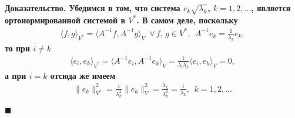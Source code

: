 \documentclass{report}
\newenvironment{Proof}{\par\noindent\bf Доказательство.\rm}{ $\blacksquare$\par}
\begin{document}
\begin{Proof}
Убедимся в том, что система $e_k\sqrt{\lambda_k}$, $k=1,2,\dots$, является ортонормированной системой в $V^*$. В самом деле, поскольку
\begin{gather*}
\langle f,g\rangle_{V^*}=\langle A^{-1}f,A^{-1}g\rangle_V\,\,\,\forall\,f,\,g\in V^*,\,\,\,A^{-1}e_k=\frac1{\lambda_k}e_k,
\end{gather*}
то при $i\neq k$
\begin{gather*}
\langle e_i,e_k\rangle_{V^*}=\langle A^{-1}e_i,A^{-1}e_k\rangle_V=\frac1{\lambda_i\lambda_k}\langle e_i,e_k\rangle_V=0,
\end{gather*}
а при $i=k$ отсюда же имеем
\begin{gather*}
\|e_k\|^2_{V^*}=\frac1{\lambda_k^2}\|e_k\|^2_V=\frac{\lambda_k}{\lambda_k^2}=\frac1{\lambda_k},\,\,\,k=1,2,\dots
\end{gather*}


\end{Proof}
\end{document}

